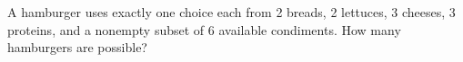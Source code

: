 A hamburger uses exactly one choice each from 2 breads, 2 lettuces, 3 cheeses, 3 proteins, and a nonempty subset of 6 available condiments. How many hamburgers are possible?

